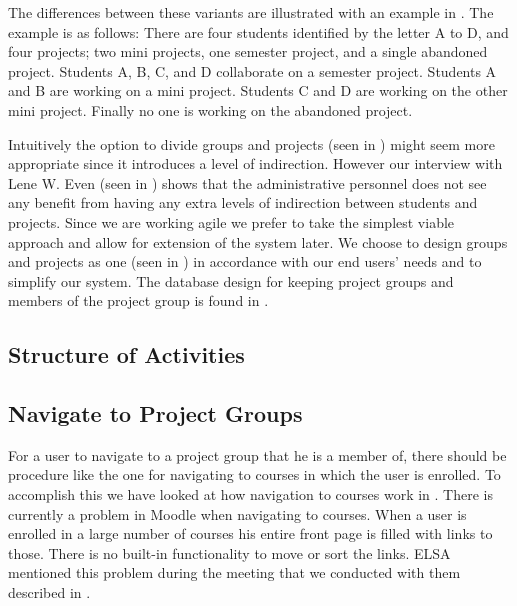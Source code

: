 The differences between these variants are illustrated with an example in .
The example is as follows:
There are four students identified by the letter A to D, and four projects; two mini projects, one semester project, and a single abandoned project.
Students A, B, C, and D collaborate on a semester project.
Students A and B are working on a mini project.
Students C and D are working on the other mini project.
Finally no one is working on the abandoned project.

Intuitively the option to divide groups and projects (seen in ) might seem more appropriate since it introduces a level of indirection.
However our interview with Lene W. Even (seen in ) shows that the administrative personnel does not see any benefit from having any extra levels of indirection between students and projects.
Since we are working agile we prefer to take the simplest viable approach and allow for extension of the system later.
We choose to design groups and projects as one (seen in ) in accordance with our end users' needs and to simplify our system.
The database design for keeping project groups and members of the project group is found in .

\subsection{Structure of Activities}
\subsection{Navigate to Project Groups}
\label{sub:designprojectgroupnavigation}
For a user to navigate to a project group that he is a member of, there should be procedure like the one for navigating to courses in which the user is enrolled.
To accomplish this we have looked at how navigation to courses work in \moodle{}.
There is currently a problem in Moodle when navigating to courses. 
When a user is enrolled in a large number of courses his entire front page is filled with links to those.
There is no built-in functionality to move or sort the links.
ELSA mentioned this problem during the meeting that we conducted with them described in .

